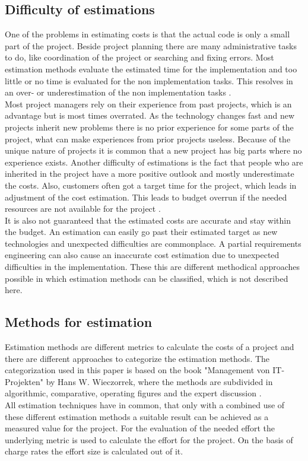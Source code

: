 \subsection{Difficulty of estimations}

One of the problems in estimating costs is that the actual code is only a small part of the project. Beside project planning there are many administrative tasks to do, like coordination of the project or searching and fixing errors. Most estimation methods evaluate the estimated time for the implementation and too little or no time is evaluated for the non implementation tasks. This resolves in an over- or underestimation of the non implementation tasks \cite{itplanung}.\\
Most project managers rely on their experience from past projects, which is an advantage but is most times overrated. As the technology changes fast and new projects inherit new problems there is no prior experience for some parts of the project, what can make experiences from prior projects useless. Because of the unique nature of projects it is common that a new project has big parts where no experience exists. Another difficulty of estimations is the fact that people who are inherited in the project have a more positive outlook and mostly underestimate the costs.
Also, customers often got a target time for the project, which leads in adjustment of the cost estimation. This leads to budget overrun if the needed resources are not available for the project \cite{winfwiki}.\\
It is also not guaranteed that the estimated costs are accurate and stay within the budget. An estimation can easily go past their estimated target as new technologies and unexpected difficulties are commonplace. A partial requirements engineering can also cause an inaccurate cost estimation due to unexpected difficulties in the implementation. These this are different methodical approaches possible in which estimation methods can be classified, which is not described here.\\

\subsection{Methods for estimation}\label{chapter:estimationmethods}

Estimation methods are different metrics to calculate the costs of a project and there are different approaches to categorize the estimation methods. The categorization used in this paper is based on the book "Management von IT-Projekten" by Hans W. Wieczorrek, where the methods are subdivided in algorithmic, comparative, operating figures and the expert discussion \cite{itplanung}.\\
All estimation techniques have in common, that only with a combined use of these different estimation methods a suitable result can be achieved as a measured value for the project. For the evaluation of the needed effort the underlying metric is used to calculate the effort for the project. On the basis of charge rates the effort size is calculated out of it.\\

